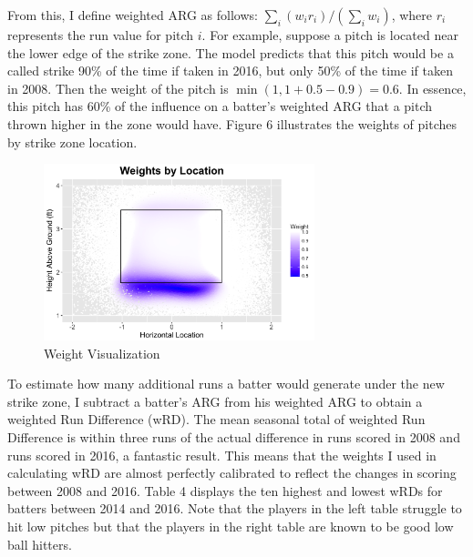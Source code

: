 \documentclass[11pt]{article}
\begin{document}
From this, I define weighted ARG as follows: $\sum_i (w_i r_i)/ (\sum_i w_i)$, where $r_i$ represents the run value for pitch $i$.  For example, suppose a pitch is located near the lower edge of the strike zone.  The model predicts that this pitch would be a called strike 90\% of the time if taken in 2016, but only 50\% of the time if taken in 2008.  Then the weight of the pitch is $\min(1, 1 + 0.5 - 0.9) = 0.6$.    In essence, this pitch has 60\% of the influence on a batter's weighted ARG that a pitch thrown higher in the zone would have.  Figure 6 illustrates the weights of pitches by strike zone location.  

\begin{figure}[ht]
\centering
\includegraphics[width = 0.7\textwidth]{../Output/fig6.png}
\caption{Weight Visualization}
\end{figure}

To estimate how many additional runs a batter would generate under the new strike zone, I subtract a batter's ARG from his weighted ARG to obtain a weighted Run Difference (wRD).  The mean seasonal total of weighted Run Difference is within three runs of the actual difference in runs scored in 2008 and runs scored in 2016, a fantastic result.  This means that the weights I used in calculating wRD are almost perfectly calibrated to reflect the changes in scoring between 2008 and 2016.  Table 4 displays the ten highest and lowest wRDs for batters between 2014 and 2016.  Note that the players in the left table struggle to hit low pitches but that the players in the right table are known to be good low ball hitters.
\end{document}
